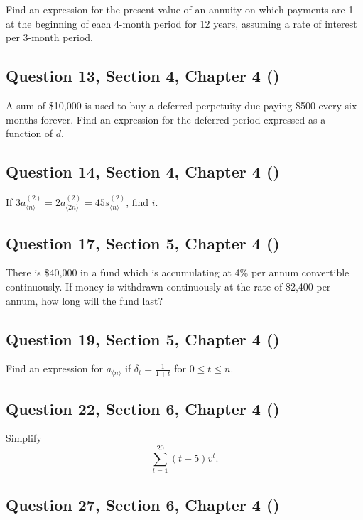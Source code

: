 \documentclass[12pt, a4paper]{article}
\newcommand{\angl}[1]{\langle #1 \rangle}
\begin{document}
\noindent Find an expression for the present value of an annuity on which payments are 1 at the beginning of each 4-month period for 12 years, assuming a rate of interest per 3-month period.

\subsection*{Question 13, Section 4, Chapter 4  (\cite{toi3rd})}

\noindent A sum of \$10{,}000 is used to buy a deferred perpetuity-due paying \$500 every six months forever. Find an expression for the deferred period expressed as a function of \( d. \)

\subsection*{Question 14, Section 4, Chapter 4  (\cite{toi3rd})}

\noindent If \( 3 a_{\angl{n}}^{(2)} = 2 a_{\angl{2n}}^{(2)} = 45 s_{\angl{n}}^{(2)} \), find \( i. \)

\subsection*{Question 17, Section 5, Chapter 4  (\cite{toi3rd})}

\noindent There is \$40{,}000 in a fund which is accumulating at 4\% per annum convertible continuously. If money is withdrawn continuously at the rate of \$2{,}400 per annum, how long will the fund last?

\subsection*{Question 19, Section 5, Chapter 4  (\cite{toi3rd})}

\noindent Find an expression for \( \bar{a}_{\angl{n}} \) if \( \delta_t = \frac{1}{1 + t} \) for \( 0 \le t \le n. \)

\subsection*{Question 22, Section 6, Chapter 4  (\cite{toi3rd})}

\noindent Simplify
\[
\sum_{t=1}^{20} (t + 5)v^t.
\]

\subsection*{Question 27, Section 6, Chapter 4  (\cite{toi3rd})}
\end{document}
